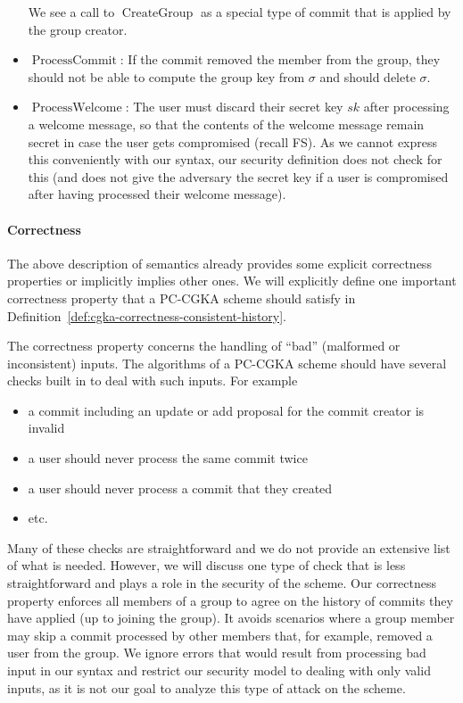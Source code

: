 \begin{itemize}
	      We see a call to $\operatorname{CreateGroup}$ as a special type of commit that is applied by the group creator.


	\item $\operatorname{ProcessCommit}$: If the commit removed the member from the group, they should not be able to compute the group key from $\sigma$ and should delete $\sigma$.
	\item $\operatorname{ProcessWelcome}$:  The user must discard their secret key $sk$ after processing a welcome message, so that the contents of the welcome message remain secret in case the user gets compromised (recall FS). As we cannot express this conveniently with our syntax, our security definition does not check for this (and does not give the adversary the secret key if a user is compromised after having processed their welcome message).
\end{itemize}

\paragraph{Correctness}

The above description of semantics already provides some explicit correctness properties or implicitly implies other ones. We will explicitly define one important correctness property that a PC-CGKA scheme should satisfy in Definition~\vref{def:cgka-correctness-consistent-history}. 

The correctness property concerns the handling of ``bad'' (malformed or inconsistent) inputs. The algorithms of a PC-CGKA scheme should have several checks built in to deal with such inputs. For example
\begin{itemize}
	\item a commit including an update or add proposal for the commit creator is invalid
	\item a user should never process the same commit twice
	\item a user should never process a commit that they created
	\item etc.
\end{itemize}
Many of these checks are straightforward and we do not provide an extensive list of what is needed. However, we will discuss one type of check that is less straightforward and plays a role in the security of the scheme. Our correctness property enforces all members of a group to agree on the history of commits they have applied (up to joining the group). It avoids scenarios where a group member may skip a commit processed by other members that, for example, removed a user from the group. We ignore errors that would result from processing bad input in our syntax and restrict our security model to dealing with only valid inputs, as it is not our goal to analyze this type of attack on the scheme.

